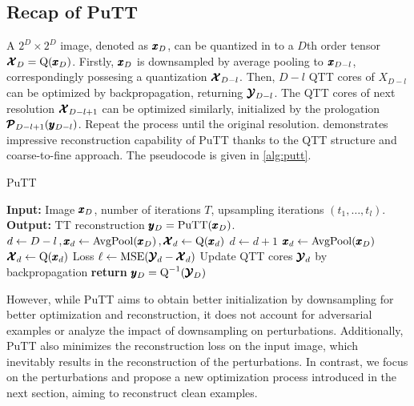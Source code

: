 \subsection{Recap of PuTT \cite{loeschcke2024coarse}}
\label{app:TN.putt}

A $2^D \times 2^D$ image, denoted as $\pmb{x}_D$, can be quantized in to a $D$th
order tensor $\pmb{\mathcal{X}}_D=\text{Q}(\pmb{x}_D)$.
Firstly, $\pmb{x}_D$ is downsampled by average pooling to $\pmb{x}_{D-l}$, correspondingly possesing a quantization $\pmb{\mathcal{X}}_{D-l}$.
Then, $D-l$ QTT cores of ${X}_{D-l}$ can be optimized by backpropagation, returning $\pmb{\mathcal{Y}}_{D-l}$.
The QTT cores of next resolution $\pmb{\mathcal{X}}_{D-l+1}$
can be optimized similarly, initialized by the prologation $\pmb{\mathcal{P}}_{D-l+1} (\pmb{y}_{D-l})$.
Repeat the process until the original resolution. \cite{loeschcke2024coarse} demonstrates impressive reconstruction
capability of PuTT thanks to the QTT structure and coarse-to-fine approach.
The pseudocode is given in \cref{alg:putt}.

\begin{algorithm}[H]
    \caption{PuTT \cite{loeschcke2024coarse}}
    \label{alg:putt}
    \begin{algorithmic}
        \STATE \textbf{Input:} Image $\pmb{x}_D$, number of iterations $T$,
        upsampling iterations $(t_1, \ldots, t_l)$.
        \STATE \textbf{Output:} TT reconstruction $\pmb{y}_D = \text{PuTT}(\pmb{x}_D)$.
        \STATE $d\gets D-l \,, \pmb{x}_{d}\gets\operatorname{AvgPool}(\pmb{x}_D) \,, \pmb{\mathcal{X}}_{d}\gets \operatorname{Q}(\pmb{x}_d)$
            \STATE $d \gets d+1$
            \STATE $\pmb{x}_{d} \gets \operatorname{AvgPool}(\pmb{x}_D)$
            \STATE $\pmb{\mathcal{X}}_{d} \gets \operatorname{Q}(\pmb{x}_d)$
        \ENDIF
        \STATE Loss $\ell \gets \text{MSE}(\pmb{\mathcal{Y}}_d-\pmb{\mathcal{X}}_d)$
        \STATE Update QTT cores $\pmb{\mathcal{Y}}_d$ by backpropagation
        \ENDFOR
        \STATE \textbf{return} $\pmb{y}_D = \operatorname{Q}^{-1}(\pmb{\mathcal{Y}}_D)$
    \end{algorithmic}
\end{algorithm}

However, while PuTT aims to obtain better initialization by downsampling for better optimization and reconstruction, it does not account for adversarial examples or analyze the impact of downsampling on perturbations. Additionally, PuTT also minimizes the reconstruction loss on the input image, which inevitably results in the reconstruction of the perturbations. In contrast, we focus on the perturbations and propose a new optimization process introduced in the next section, aiming to reconstruct clean examples.


